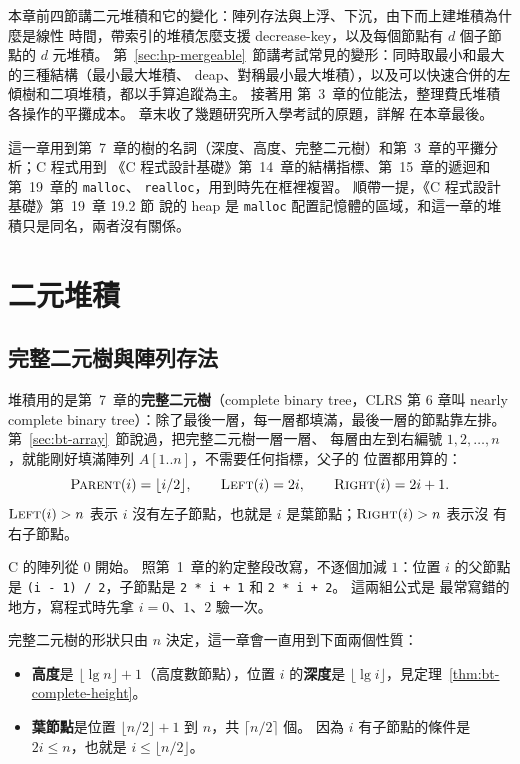 本章前四節講二元堆積和它的變化：陣列存法與上浮、下沉，由下而上建堆積為什麼是線性
時間，帶索引的堆積怎麼支援 decrease-key，以及每個節點有 $d$ 個子節點的 $d$ 元堆積。
第~\ref{sec:hp-mergeable}~節講考試常見的變形：同時取最小和最大的三種結構（最小最大堆積、
deap、對稱最小最大堆積），以及可以快速合併的左傾樹和二項堆積，都以手算追蹤為主。 接著用
第~3~章的位能法，整理費氏堆積各操作的平攤成本。 章末收了幾題研究所入學考試的原題，詳解
在本章最後。

這一章用到第~7~章的樹的名詞（深度、高度、完整二元樹）和第~3~章的平攤分析；C 程式用到
《C 程式設計基礎》第~14~章的結構指標、第~15~章的遞迴和第~19~章的 \texttt{malloc}、
\texttt{realloc}，用到時先在框裡複習。 順帶一提，《C 程式設計基礎》第~19~章 19.2 節
說的 heap 是 \texttt{malloc} 配置記憶體的區域，和這一章的堆積只是同名，兩者沒有關係。

\section{二元堆積}
\label{sec:hp-binary}

\subsection{完整二元樹與陣列存法}

堆積用的是第~7~章的\textbf{完整二元樹}（complete binary tree，CLRS 第 6 章叫 nearly
complete binary tree）：除了最後一層，每一層都填滿，最後一層的節點靠左排。 第~\ref{sec:bt-array}~節說過，把完整二元樹一層一層、
每層由左到右編號 $1, 2, \ldots, n$，就能剛好填滿陣列 $A[1..n]$，不需要任何指標，父子的
位置都用算的：
\[
\proc{Parent}(i) = \lfloor i / 2 \rfloor, \qquad
\proc{Left}(i) = 2i, \qquad
\proc{Right}(i) = 2i + 1.
\]
$\proc{Left}(i) > n$ 表示 $i$ 沒有左子節點，也就是 $i$ 是葉節點；$\proc{Right}(i) > n$ 表示沒
有右子節點。

C 的陣列從 $0$ 開始。 照第~1~章的約定整段改寫，不逐個加減 $1$：位置 $i$ 的父節點是
\texttt{(i - 1) / 2}，子節點是 \texttt{2 * i + 1} 和 \texttt{2 * i + 2}。 這兩組公式是
最常寫錯的地方，寫程式時先拿 $i = 0$、$1$、$2$ 驗一次。

完整二元樹的形狀只由 $n$ 決定，這一章會一直用到下面兩個性質：

\begin{itemize}
\item \textbf{高度}是 $\lfloor \lg n \rfloor + 1$（高度數節點），位置 $i$ 的\textbf{深度}是
$\lfloor \lg i \rfloor$，見定理~\ref{thm:bt-complete-height}。
\item \textbf{葉節點}是位置 $\lfloor n/2 \rfloor + 1$ 到 $n$，共 $\lceil n/2 \rceil$ 個。 因為
$i$ 有子節點的條件是 $2i \le n$，也就是 $i \le \lfloor n/2 \rfloor$。
\end{itemize}

